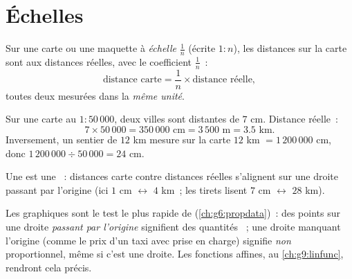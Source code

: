 \section{Échelles}

\begin{definition}[Échelle]\label{def:g7:prop:scale}
Sur une carte ou une maquette à \emph{échelle}
$\frac{1}{n}$ (écrite $1 : n$), les distances sur la carte sont
 aux distances réelles, avec le coefficient
$\frac1n$~:
\[
\text{distance carte} = \frac{1}{n} \times \text{distance réelle},
\]
toutes deux mesurées dans la \emph{même unité}.
\end{definition}

\begin{example}\label{ex:g7:prop:scale}
Sur une carte au $1 : 50\,000$, deux villes sont distantes de $7$ cm.
Distance réelle~:
\[
7 \times 50\,000 = 350\,000 \text{ cm} = 3\,500 \text{ m} = 3.5
\text{ km}.
\]
Inversement, un sentier de $12$ km mesure sur la carte
$12$ km $= 1\,200\,000$ cm, donc $1\,200\,000 \div 50\,000 = 24$ cm.
\end{example}

\begin{omfigure}

{\small Une  est une ~: distances carte contre
distances réelles s'alignent sur une droite passant par l'origine (ici
$1$ cm $\leftrightarrow$ $4$ km~; les tirets lisent $7$ cm
$\leftrightarrow$ $28$ km).}
\end{omfigure}

\begin{remark}
Les graphiques sont le test le plus rapide de 
(\cref{ch:g6:propdata})~: des points sur une droite \emph{passant par
l'origine} signifient des quantités ~; une droite
manquant l'origine (comme le prix d'un taxi avec prise en charge)
signifie \emph{non} proportionnel, même si c'est une droite. Les
fonctions affines, au \cref{ch:g9:linfunc}, rendront cela précis.
\end{remark}

